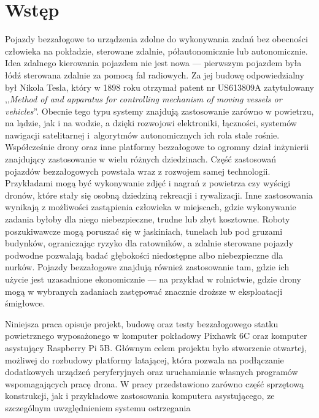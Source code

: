 \documentclass[a4paper,12pt]{book}
\renewcommand{\chaptermark}[1]{\markboth{#1}{}}
\begin{document}
\chapter*{Wstęp}
\chaptermark{Wstęp} %
    Pojazdy bezzałogowe to urządzenia zdolne do wykonywania zadań bez obecności człowieka na pokładzie, sterowane zdalnie, półautonomicznie lub autonomicznie. Idea zdalnego 
    kierowania pojazdem nie jest nowa --- pierwszym pojazdem była łódź sterowana zdalnie za pomocą fal radiowych. Za jej budowę odpowiedzialny był Nikola Tesla, który w 1898 roku 
    otrzymał patent nr US613809A zatytułowany ,,\textit{Method of and apparatus for controlling mechanism of moving vessels or vehicles}''. 
    Obecnie tego typu systemy znajdują zastosowanie zarówno w powietrzu, na lądzie, jak i na wodzie, a dzięki rozwojowi elektroniki, łączności, systemów nawigacji satelitarnej 
    i~algorytmów autonomicznych ich rola stale rośnie. Współcześnie drony oraz inne platformy bezzałogowe to ogromny dział inżynierii znajdujący zastosowanie w wielu różnych dziedzinach. 
    Część zastosowań pojazdów bezzałogowych powstała wraz z rozwojem samej technologii. Przykładami mogą być wykonywanie zdjęć i nagrań z powietrza czy wyścigi dronów, które stały 
    się osobną dziedziną rekreacji i rywalizacji. Inne zastosowania wynikają z możliwości zastąpienia człowieka w miejscach, gdzie wykonywanie zadania byłoby dla niego niebezpieczne, 
    trudne lub zbyt kosztowne. Roboty poszukiwawcze mogą poruszać się w jaskiniach, tunelach lub pod gruzami budynków, ograniczając ryzyko dla ratowników, a zdalnie sterowane 
    pojazdy podwodne pozwalają badać głębokości niedostępne albo niebezpieczne dla nurków. Pojazdy bezzałogowe znajdują również zastosowanie tam, gdzie ich użycie jest uzasadnione 
    ekonomicznie --- na przykład w rolnictwie, gdzie drony mogą w wybranych zadaniach zastępować znacznie droższe w eksploatacji śmigłowce.\par
    Niniejsza praca opisuje projekt, budowę oraz testy bezzałogowego statku powietrznego wyposażonego w komputer pokładowy Pixhawk 6C oraz komputer asystujący Raspberry Pi 5B. 
    Głównym celem projektu było stworzenie otwartej, możliwej do rozbudowy platformy latającej, która pozwala na podłączanie dodatkowych urządzeń peryferyjnych oraz uruchamianie własnych programów 
    wspomagających pracę drona. W pracy przedstawiono zarówno część sprzętową konstrukcji, jak i przykładowe zastosowania komputera asystującego, ze szczególnym uwzględnieniem systemu ostrzegania 
\end{document}
